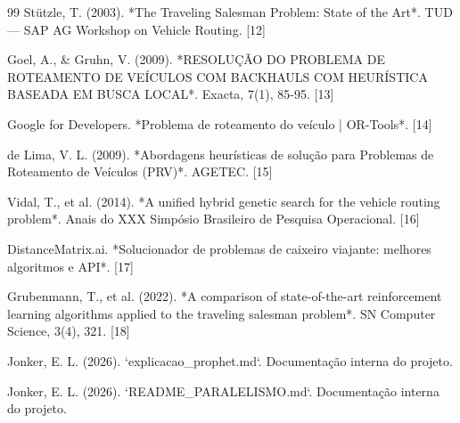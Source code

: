 \documentclass[11pt,a4paper,twocolumn]{article}
\begin{document}
\begin{thebibliography}{99}
Stützle, T. (2003). *The Traveling Salesman Problem: State of the Art*. TUD— SAP AG Workshop on Vehicle Routing. [12]

Goel, A., & Gruhn, V. (2009). *RESOLUÇÃO DO PROBLEMA DE ROTEAMENTO DE VEÍCULOS COM BACKHAULS COM HEURÍSTICA BASEADA EM BUSCA LOCAL*. Exacta, 7(1), 85-95. [13]

Google for Developers. *Problema de roteamento do veículo | OR-Tools*. [14]

de Lima, V. L. (2009). *Abordagens heurísticas de solução para Problemas de Roteamento de Veículos (PRV)*. AGETEC. [15]

Vidal, T., et al. (2014). *A unified hybrid genetic search for the vehicle routing problem*. Anais do XXX Simpósio Brasileiro de Pesquisa Operacional. [16]

DistanceMatrix.ai. *Solucionador de problemas de caixeiro viajante: melhores algoritmos e API*. [17]

Grubenmann, T., et al. (2022). *A comparison of state-of-the-art reinforcement learning algorithms applied to the traveling salesman problem*. SN Computer Science, 3(4), 321. [18]

Jonker, E. L. (2026). `explicacao_prophet.md`. Documentação interna do projeto.

Jonker, E. L. (2026). `README_PARALELISMO.md`. Documentação interna do projeto.

\end{thebibliography}
\end{document}
